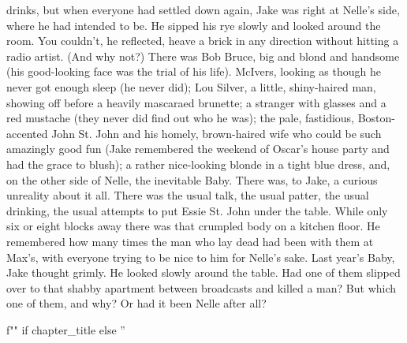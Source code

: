 \documentclass{novel}
\begin{document}
drinks, but when everyone had settled down again, Jake was right at Nelle’s side, where he had intended to be. He sipped his rye slowly and looked around the room. You couldn’t, he reflected, heave a brick in any direction without hitting a radio artist. (And why not?) There was Bob Bruce, big and blond and handsome (his good-looking face was the trial of his life). McIvers, looking as though he never got enough sleep (he never did); Lou Silver, a little, shiny-haired man, showing off before a heavily mascaraed brunette; a stranger with glasses and a red mustache (they never did find out who he was); the pale, fastidious, Boston-accented John St. John and his homely, brown-haired wife who could be such amazingly good fun (Jake remembered the weekend of Oscar’s house party and had the grace to blush); a rather nice-looking blonde in a tight blue dress, and, on the other side of Nelle, the inevitable Baby. There was, to Jake, a curious unreality about it all. There was the usual talk, the usual patter, the usual drinking, the usual attempts to put Essie St. John under the table. While only six or eight blocks away there was that crumpled body on a kitchen floor. He remembered how many times the man who lay dead had been with them at Max’s, with everyone trying to be nice to him for Nelle’s sake. Last year’s Baby, Jake thought grimly. He looked slowly around the table. Had one of them slipped over to that shabby apartment between broadcasts and killed a man? But which one of them, and why? Or had it been Nelle after all?

\begin{ChapterStart}
\vspace{3\nbs}
f"" if chapter_title else ''
\end{ChapterStart}
\end{document}
